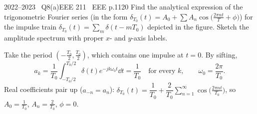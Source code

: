 \begin{qcard}{2022--2023 \textbullet\ Q8(a)}{EEE 211 \textbullet\ EEE p.11}{20}
Find the analytical expression of the trigonometric Fourier series (in the form $\delta_{T_0}(t)=A_0+\sum A_n\cos\big(\frac{2\pi nt}{T}+\phi\big)$) for the impulse train $\delta_{T_0}(t)=\sum_{m}\delta(t-mT_0)$ depicted in the figure. Sketch the amplitude spectrum with proper $x$- and $y$-axis labels.
\end{qcard}
\begin{solution}
Take the period $(-\frac{T_0}2,\frac{T_0}2)$, which contains one impulse at $t=0$. By sifting,
\[a_k=\frac1{T_0}\int_{-T_0/2}^{T_0/2}\delta(t)e^{-jk\omega_0t}\dd t=\frac1{T_0}\quad\text{for every }k,\qquad\omega_0=\frac{2\pi}{T_0}.\]
Real coefficients pair up ($a_{-n}=a_n$): $\delta_{T_0}(t)=\dfrac1{T_0}+\dfrac2{T_0}\displaystyle\sum_{n=1}^{\infty}\cos\!\Big(\frac{2\pi nt}{T_0}\Big)$, so $A_0=\frac1{T_0}$, $A_n=\frac2{T_0}$, $\phi=0$.
\begin{center}\end{center}
\end{solution}

